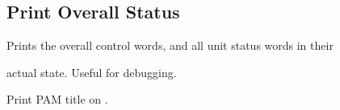 \subsection{Print Overall Status}


Prints the overall control words, and all unit status words in their

actual state. Useful for debugging.


Print PAM title on .
